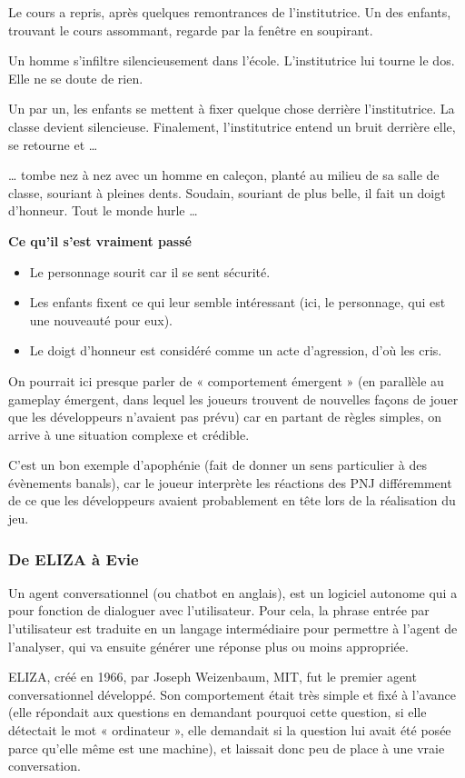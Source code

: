 \documentclass[a4paper, 12pt]{article} %
\begin{document}
Le cours a repris, après quelques remontrances de l’institutrice. Un des enfants, trouvant le cours assommant, regarde par la fenêtre en soupirant.

Un homme s’infiltre silencieusement dans l’école. L’institutrice lui tourne le dos. Elle ne se doute de rien.

Un par un, les enfants se mettent à fixer quelque chose derrière l’institutrice. La classe devient silencieuse. Finalement, l’institutrice entend un bruit derrière elle, se retourne et …

… tombe nez à nez avec un homme en caleçon, planté au milieu de sa salle de classe, souriant à pleines dents. Soudain, souriant de plus belle, il fait un doigt d’honneur. Tout le monde hurle …

\textbf{Ce qu'il s'est vraiment passé}
\begin{itemize}
	\item Le personnage sourit car il se sent sécurité.
	\item Les enfants fixent ce qui leur semble intéressant (ici, le personnage, qui est une nouveauté pour eux).
	\item Le doigt d’honneur est considéré comme un acte d’agression, d’où les cris.
\end{itemize}	

On pourrait ici presque parler de « comportement émergent » (en parallèle au gameplay émergent, dans lequel les joueurs trouvent de nouvelles façons de jouer que les développeurs n’avaient pas prévu) car en partant de règles simples, on arrive à une situation complexe et crédible.

C’est un bon exemple d’apophénie (fait de donner un sens particulier à des évènements banals), car le joueur interprète les réactions des PNJ différemment de ce que les développeurs avaient probablement en tête lors de la réalisation du jeu. 

\newpage
\subsubsection{De ELIZA à Evie}

Un agent conversationnel (ou chatbot en anglais), est un logiciel autonome qui a pour fonction de dialoguer avec l’utilisateur. Pour cela, la phrase entrée par l’utilisateur est traduite en un langage intermédiaire pour permettre à l’agent de l’analyser, qui va ensuite générer une réponse plus ou moins appropriée.

ELIZA, créé en 1966, par Joseph Weizenbaum, MIT, fut le premier agent conversationnel développé. Son comportement était très simple et fixé à l'avance (elle répondait aux questions en demandant pourquoi cette question, si elle détectait le mot « ordinateur », elle demandait si la question lui avait été posée parce qu’elle même est une machine), et laissait donc peu de place à une vraie conversation.
\end{document}
